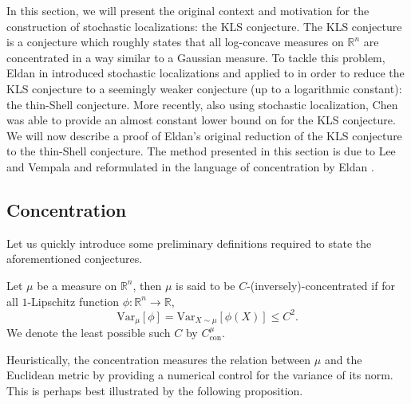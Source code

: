 In this section, we will present the original context and motivation for the construction of stochastic 
localizations: the KLS conjecture. The KLS conjecture is a conjecture which roughly states that all 
log-concave measures on \(\mathbb{R}^n\) are concentrated in a way similar to a Gaussian measure. 
To tackle this problem, Eldan in \cite{Eldan_2013} introduced stochastic localizations and applied to 
in order to reduce the KLS conjecture to a seemingly weaker conjecture (up to a logarithmic constant): 
the thin-Shell conjecture. More recently, also using stochastic localization, Chen \cite{Chen_2020} 
was able to provide an almost constant lower bound on for the KLS conjecture. We will now describe 
a proof of Eldan's original reduction of the KLS conjecture to the thin-Shell conjecture.
The method presented in this section is due to Lee and Vempala \cite{Lee_2016} and reformulated in 
the language of concentration by Eldan \cite{Eldan_notes}.

\subsection{Concentration}

Let us quickly introduce some preliminary definitions required to state the aforementioned conjectures. 

\begin{definition}
  Let \(\mu\) be a measure on \(\mathbb{R}^n\), then \(\mu\) is said to be \(C\)-(inversely)-concentrated if
  for all \(1\)-Lipschitz function \(\phi : \mathbb{R}^n \to \mathbb{R}\), 
  \begin{equation}
    \text{Var}_\mu[\phi] = \text{Var}_{X \sim \mu}[\phi(X)] \le C^2.
  \end{equation}
  We denote the least possible such \(C\) by \(C^\mu_{\text{con}}\).
\end{definition}

Heuristically, the concentration measures the relation between \(\mu\) and the Euclidean metric by 
providing a numerical control for the variance of its norm. This is perhaps best illustrated by the following proposition.


